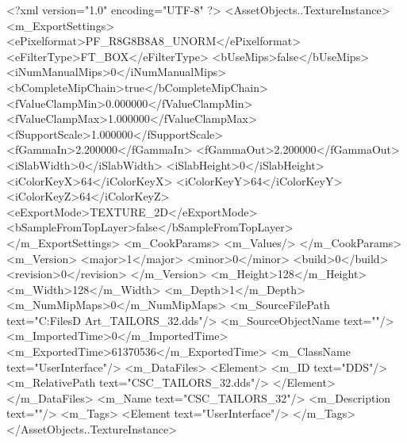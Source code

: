 <?xml version="1.0" encoding="UTF-8" ?>
<AssetObjects..TextureInstance>
	<m_ExportSettings>
		<ePixelformat>PF_R8G8B8A8_UNORM</ePixelformat>
		<eFilterType>FT_BOX</eFilterType>
		<bUseMips>false</bUseMips>
		<iNumManualMips>0</iNumManualMips>
		<bCompleteMipChain>true</bCompleteMipChain>
		<fValueClampMin>0.000000</fValueClampMin>
		<fValueClampMax>1.000000</fValueClampMax>
		<fSupportScale>1.000000</fSupportScale>
		<fGammaIn>2.200000</fGammaIn>
		<fGammaOut>2.200000</fGammaOut>
		<iSlabWidth>0</iSlabWidth>
		<iSlabHeight>0</iSlabHeight>
		<iColorKeyX>64</iColorKeyX>
		<iColorKeyY>64</iColorKeyY>
		<iColorKeyZ>64</iColorKeyZ>
		<eExportMode>TEXTURE_2D</eExportMode>
		<bSampleFromTopLayer>false</bSampleFromTopLayer>
	</m_ExportSettings>
	<m_CookParams>
		<m_Values/>
	</m_CookParams>
	<m_Version>
		<major>1</major>
		<minor>0</minor>
		<build>0</build>
		<revision>0</revision>
	</m_Version>
	<m_Height>128</m_Height>
	<m_Width>128</m_Width>
	<m_Depth>1</m_Depth>
	<m_NumMipMaps>0</m_NumMipMaps>
	<m_SourceFilePath text="C:\Users\Shadow\Desktop\Working Files\2D Art\Quarters\Tailors\CSC_TAILORS_32.dds"/>
	<m_SourceObjectName text=""/>
	<m_ImportedTime>0</m_ImportedTime>
	<m_ExportedTime>61370536</m_ExportedTime>
	<m_ClassName text="UserInterface"/>
	<m_DataFiles>
		<Element>
			<m_ID text="DDS"/>
			<m_RelativePath text="CSC_TAILORS_32.dds"/>
		</Element>
	</m_DataFiles>
	<m_Name text="CSC_TAILORS_32"/>
	<m_Description text=""/>
	<m_Tags>
		<Element text="UserInterface"/>
	</m_Tags>
</AssetObjects..TextureInstance>


